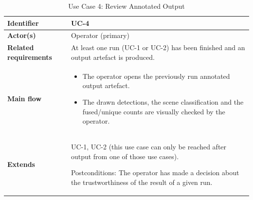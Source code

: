 
\begin{longtable}{|p{3.0cm}|p{12.5cm}|}

\caption{Use Case 4: Review Annotated Output}
\label{tab:uc4} \\

\hline

\textbf{Identifier} &
UC-4
\\
\hline

\textbf{Actor(s)} &
Operator (primary)
\\
\hline

\textbf{Related requirements} &
At least one run (UC-1 or UC-2) has been finished and an output artefact is produced.
\\
\hline

\textbf{Main flow} &
\begin{itemize}[leftmargin=16pt, itemsep=0pt, topsep=0pt]
    \item The operator opens the previously run annotated output artefact.
    
    \item The drawn detections, the scene classification and the fused/unique counts are visually checked by the operator.
    
\end{itemize}
\\
\hline

\textbf{Extends} &
UC-1, UC-2 (this use case can only be reached after output from one of those use cases).

Postconditions: The operator has made a decision about the trustworthiness of the result of a given run.
\\
\hline

\end{longtable}




